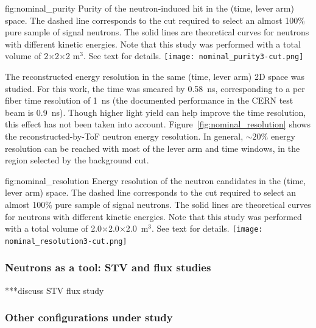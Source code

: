 \begin{dunefigure}{fig:nominal_purity}
{Purity of the neutron-induced hit in the (time, lever arm) space.
The dashed line corresponds to the cut required to select an almost 100\% pure sample of signal neutrons. The solid lines are theoretical curves for neutrons with different kinetic energies.
Note that this study was performed with a total volume of 2$\times$2$\times$2 m$^3$.
See text for details.}
  \texttt{[image: nominal\_purity3-cut.png]}
\end{dunefigure}

The reconstructed energy resolution in the same (time, lever arm) 2D space was studied. For this work, the time was smeared by 0.58~ns, corresponding to a per fiber time resolution of 1~ns (the documented performance in the CERN test beam is 0.9~ns).
Though higher light yield can help improve the time resolution, this effect has not been taken into account. Figure~\ref{fig:nominal_resolution} shows the reconstructed-by-ToF neutron energy resolution. In general, $\sim 20 \%$ energy resolution can be reached with most of the lever arm and time windows, 
in the region selected by the background cut. \\

\begin{dunefigure}{fig:nominal_resolution}
{Energy resolution of the neutron candidates in the (time, lever arm) space. 
The dashed line corresponds to the cut required to select an almost 100\% pure sample of signal neutrons. The solid lines are theoretical curves for neutrons with different kinetic energies.
Note that this study was performed with a total volume of 2.0$\times$2.0$\times$2.0~m$^3$.
See text for details.}
  \texttt{[image: nominal\_resolution3-cut.png]}
\end{dunefigure}




\subsubsection{Neutrons as a tool: STV and flux studies}

***discuss STV flux study

\subsubsection{Other configurations under study}

